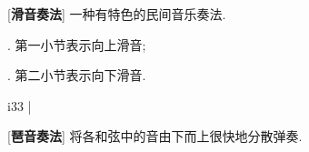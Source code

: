 [\textbf{滑音奏法}] 一种有特色的民间音乐奏法.\par
{}. 第一小节表示向上滑音;\par
{}. 第二小节表示向下滑音.\par
\startextract
\Notes {}\slide i33\en
\Notes \en\bar
\Notes {}\en
\Notes \en
\zendextract

[\textbf{琶音奏法}] 将各和弦中的音由下而上很快地分散弹奏.\par
\startextract
\Notes {}\en
\zendextract



